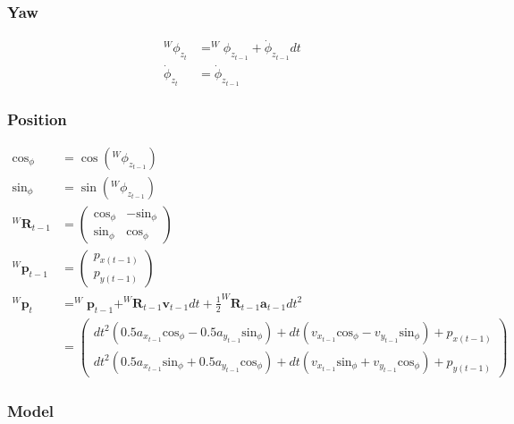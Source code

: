 \documentclass{article}
\newcommand{\Rotation}[2]{^{#1}\textbf{R}_{#2}}
\newcommand{\Position}[2]{^{#1}\textbf{p}_{#2}}
\newcommand{\Yaw}[1]{^W\phi_{z_{#1}}}
\begin{document}
\subsubsection{Yaw}
\begin{align}
  \Yaw{t} &= \Yaw{t-1} + \dot{\phi}_{z_{t-1}} dt \\
  \dot{\phi}_{z_t} &= \dot{\phi}_{z_{t-1}}
\end{align}

\subsubsection{Position}
\begin{align}
  \textrm{cos}_\phi &= \cos{\left(\Yaw{t-1}\right)} \\
  \textrm{sin}_\phi &= \sin{\left(\Yaw{t-1}\right)} \\
  \Rotation{W}{t-1} &= \left(\begin{matrix}\textrm{cos}_\phi & - \textrm{sin}_\phi\\\textrm{sin}_\phi & \textrm{cos}_\phi\end{matrix}\right) \\
  \Position{W}{t-1} &= \left(\begin{matrix}p_{x (t-1)}\\p_{y (t-1)}\end{matrix}\right) \\
  \Position{W}{t} &= \Position{W}{t-1} + \Rotation{W}{t-1}\textbf{v}_{t-1}dt + \frac{1}{2}\Rotation{W}{t-1}\textbf{a}_{t-1}dt^2 \\
  &= \left(\begin{matrix}dt^{2} \left(0.5 a_{x_{t-1}} \textrm{cos}_\phi - 0.5 a_{y_{t-1}} \textrm{sin}_\phi\right) + dt \left(v_{x_{t-1}} \textrm{cos}_\phi - v_{y_{t-1}} \textrm{sin}_\phi\right) + p_{x (t-1)}\\dt^{2} \left(0.5 a_{x_{t-1}} \textrm{sin}_\phi + 0.5 a_{y_{t-1}} \textrm{cos}_\phi\right) + dt \left(v_{x_{t-1}} \textrm{sin}_\phi + v_{y_{t-1}} \textrm{cos}_\phi\right) + p_{y (t-1)}\end{matrix}\right)
\end{align}

\subsubsection{Model}
\end{document}
